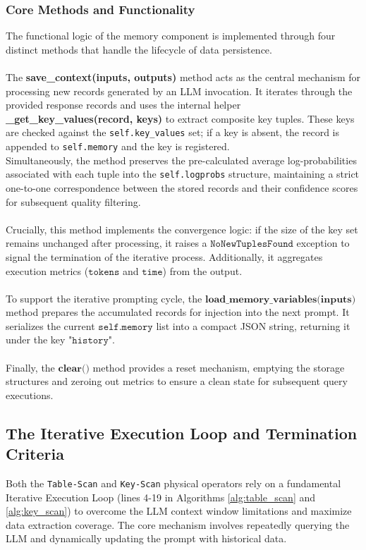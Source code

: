 \subsubsection{Core Methods and Functionality}
The functional logic of the memory component is implemented through four distinct methods that handle the lifecycle of data persistence.
\\\\
The \textbf{save\_context(inputs, outputs)} method acts as the central mechanism for processing new records generated by an LLM invocation. It iterates through the provided response records and uses the internal helper \textbf{\_get\_key\_values(record, keys)} to extract composite key tuples. These keys are checked against the \texttt{self.key\_values} set; if a key is absent, the record is appended to \texttt{self.memory} and the key is registered.\\ 
Simultaneously, the method preserves the pre-calculated average log-probabilities associated with each tuple into the \texttt{self.logprobs} structure, maintaining a strict one-to-one correspondence between the stored records and their confidence scores for subsequent quality filtering.
\\\\
Crucially, this method implements the convergence logic: if the size of the key set remains unchanged after processing, it raises a $\texttt{NoNewTuplesFound}$ exception to signal the termination of the iterative process. Additionally, it aggregates execution metrics ($\texttt{tokens}$ and $\texttt{time}$) from the output.
\\\\
To support the iterative prompting cycle, the $\textbf{load\_memory\_variables(inputs)}$ method prepares the accumulated records for injection into the next prompt. It serializes the current $\texttt{self.memory}$ list into a compact JSON string, returning it under the key $\texttt{"history"}$. 
\\\\
Finally, the $\textbf{clear()}$ method provides a reset mechanism, emptying the storage structures and zeroing out metrics to ensure a clean state for subsequent query executions.


\subsection{The Iterative Execution Loop and Termination Criteria}

Both the \texttt{Table-Scan} and \texttt{Key-Scan} physical operators rely on a fundamental Iterative Execution Loop (lines 4-19 in Algorithms \ref{alg:table_scan} and \ref{alg:key_scan}) to overcome the LLM context window limitations and maximize data extraction coverage. The core mechanism involves repeatedly querying the LLM and dynamically updating the prompt with historical data.

